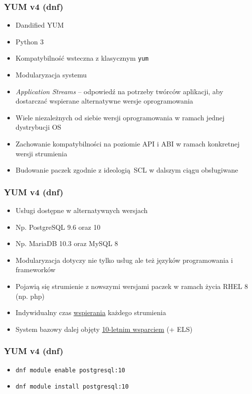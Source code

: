 \documentclass[dvipsnames,table]{beamer}
\begin{document}
\begin{frame}
\frametitle{YUM v4 (dnf)}
\begin{itemize}
	\item Dandified YUM
	\item Python 3
	\item Kompatybilność wsteczna z klasycznym {\tt yum}
	\item Modularyzacja systemu
	\item {\em Application Streams} -- odpowiedź na potrzeby twórców aplikacji, aby dostarczać wspierane alternatywne wersje oprogramowania
	\item Wiele niezależnych od siebie wersji oprogramowania w ramach jednej dystrybucji OS
	\item Zachowanie kompatybilności na poziomie API i ABI w ramach konkretnej wersji strumienia
	\item Budowanie paczek zgodnie z ideologią SCL w dalszym ciągu obsługiwane
\end{itemize}
\begin{center}
\end{center}
\end{frame}

\begin{frame}
\frametitle{YUM v4 (dnf)}
\begin{itemize}
	\item Usługi dostępne w alternatywnych wersjach
	\item Np. PostgreSQL 9.6 oraz 10
	\item Np. MariaDB 10.3 oraz MySQL 8
	\item Modularyzacja dotyczy nie tylko usług ale też języków programowania i frameworków
	\item Pojawią się strumienie z nowszymi wersjami paczek w ramach życia RHEL 8 (np. php)
	\item Indywidualny czas \href{https://access.redhat.com/node/4079021}{wspierania} każdego strumienia
	\item System bazowy dalej objęty \href{https://access.redhat.com/support/policy/updates/errata}{10-letnim wsparciem} (+ ELS)
\end{itemize}
\end{frame}

\begin{frame}
\frametitle{YUM v4 (dnf)}
\begin{itemize}
	\item {\tt dnf module enable postgresql:10}
	\item {\tt dnf module install postgresql:10}
\end{itemize}

\end{frame}
\end{document}
